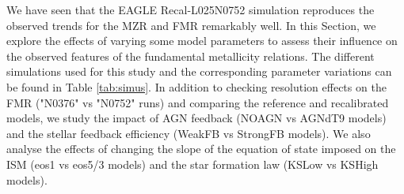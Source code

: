 \documentclass[useAMS,usenatbib]{mn2e}
\begin{document}
We have seen that the {\sc EAGLE} Recal-L025N0752 simulation reproduces 
the observed trends for the MZR and FMR remarkably well.  In this Section, we 
explore the effects of varying some model parameters to assess
their influence on the observed features of the fundamental metallicity relations.
The different simulations used for this study and the corresponding parameter variations can be found in Table \ref{tab:simus}.
In addition to checking resolution effects on the FMR ("N0376" vs "N0752" runs) and comparing the reference and recalibrated models, we 
study the impact of AGN feedback (NOAGN vs AGNdT9 models) and the stellar 
feedback efficiency (WeakFB vs StrongFB models).  
We also analyse the effects of changing the slope of the equation of state
imposed on the ISM (eos1 vs eos5/3 models)
and the star formation law (KSLow vs KSHigh models).
\end{document}
